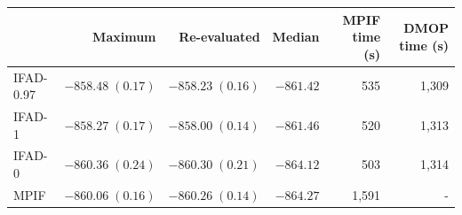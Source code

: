 \begin{tabular}{lrrrrr}
\toprule
 & Maximum & Re-evaluated & Median & MPIF time (s) & DMOP time (s) \\
\midrule
IFAD-0.97 & $-858.48\;(0.17)$ & $-858.23\;(0.16)$ & $-861.42$ & 535 & 1,309 \\
IFAD-1 & $-858.27\;(0.17)$ & $-858.00\;(0.14)$ & $-861.46$ & 520 & 1,313 \\
IFAD-0 & $-860.36\;(0.24)$ & $-860.30\;(0.21)$ & $-864.12$ & 503 & 1,314 \\
MPIF & $-860.06\;(0.16)$ & $-860.26\;(0.14)$ & $-864.27$ & 1,591 & - \\
\bottomrule
\end{tabular}
